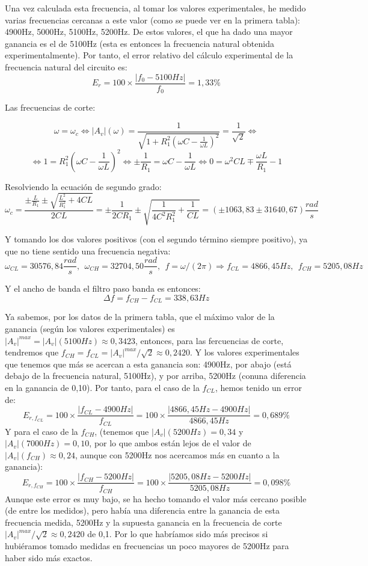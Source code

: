 \documentclass{article}
\begin{document}
Una vez calculada esta frecuencia, al tomar los valores experimentales, he medido varias frecuencias cercanas a este valor (como se puede ver en la primera tabla): 4900Hz, 5000Hz, 5100Hz, 5200Hz. De estos valores, el que ha dado una mayor ganancia es el de 5100Hz (esta es entonces la frecuencia natural obtenida experimentalmente). Por tanto, el error relativo del cálculo experimental de la frecuencia natural del circuito es: 
$$E_r=100\times\frac{|f_0-5100Hz|}{f_0}=1,33\%$$

Las frecuencias de corte:

$$\omega=\omega_c\iff |A_v|(\omega)=\frac{1}{\sqrt{1+R_1^2\left(\omega C - \frac{1}{\omega L}\right)^2}}=\frac{1}{\sqrt 2} \iff$$
$$\iff 1=R_1^2\left(\omega C - \frac{1}{\omega L}\right)^2\iff \pm\frac{1}{R_1}=\omega C - \frac{1}{\omega L}\iff 0=\omega^2 CL \mp\frac{\omega L}{R_1} - 1$$

Resolviendo la ecuación de segundo grado:
$$\omega_c=\frac{\pm \frac{ L}{R_1}\pm\sqrt{\frac{ L^2}{R_1^2}+4 CL}}{2CL}=\pm\frac{1}{2CR_1}\pm\sqrt{\frac{1}{4C^2R_1^2}+\frac{1}{CL}}=(\pm 1063,83\pm31640,67)\frac{rad}{s}$$

Y tomando los dos valores positivos (con el segundo término siempre positivo), ya que no tiene sentido una frecuencia negativa:
$$\omega_{CL}=30576,84\frac{rad}{s},\ \ \omega_{CH}=32704,50\frac{rad}{s},\ \ f=\omega /(2\pi)\Longrightarrow f_{CL}=4866,45Hz,\ \  f_{CH}=5205,08Hz$$

Y el ancho de banda el filtro paso banda es entonces: $$\Delta f=f_{CH}-f_{CL}=338,63Hz$$

Ya sabemos, por los datos de la primera tabla, que el máximo valor de la ganancia (según los valores experimentales) es $|A_v|^{max}=|A_v|(5100Hz)\approx 0,3423$, entonces, para las fercuencias de corte, tendremos que $f_{CH}=f_{CL}=|A_v|^{max}/\sqrt 2\approx 0,2420$. Y los valores experimentales que tenemos que más se acercan a esta ganancia son: 4900Hz, por abajo (está debajo de la frecuencia natural, 5100Hz), y por arriba, 5200Hz (conuna diferencia en la ganancia de 0,10). Por tanto, para el caso de la $f_{CL}$, hemos tenido un error de: 
$$E_{r, f_{CL}}=100\times\frac{|f_{CL}-4900Hz|}{f_{CL}}=100\times\frac{|4866,45Hz-4900Hz|}{4866,45Hz}=0,689\%$$
Y para el caso de la $f_{CH}$, (tenemos que $|A_v|(5200Hz)=0,34$ y $|A_v|(7000Hz)=0,10$, por lo que ambos están lejos de el valor de $|A_v|(f_{CH})\approx 0,24$, aunque con 5200Hz nos acercamos más en cuanto a la ganancia):
$$E_{r, f_{CH}}=100\times\frac{|f_{CH}-5200Hz|}{f_{CH}}=100\times\frac{|5205,08Hz-5200Hz|}{5205,08Hz}=0,098\%$$
Aunque este error es muy bajo, se ha hecho tomando el valor más cercano posible (de entre los medidos), pero había una diferencia entre la ganancia de esta frecuencia medida, 5200Hz y la supuesta ganancia en la frecuencia de corte $|A_v|^{max}/\sqrt 2\approx 0,2420$ de 0,1. Por lo que habríamos sido más precisos si hubiéramos tomado medidas en frecuencias un poco mayores de 5200Hz para haber sido más exactos.
\end{document}
